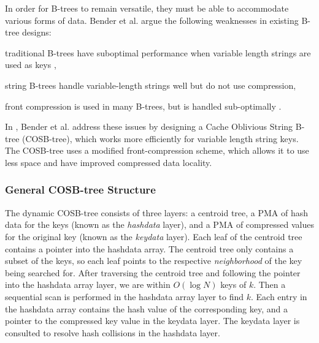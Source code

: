 \documentclass[preprint]{style}
\begin{document}
In order for B-trees to remain versatile, they must be able to accommodate
various forms of data. Bender et al. argue the following weaknesses in
existing B-tree designs: 
\begin{inparaenum}[(a)]
  \item traditional B-trees have suboptimal performance when variable length
  strings are used as keys \cite{BenderDemainColton},
  \item string B-trees \cite{Ferragina98} handle variable-length strings well
  but do not use compression, 
  \item front compression \cite{BayerUn77,ClarkSaSt69,Comer79,Wagner73} is used
  in many B-trees, but is handled sub-optimally \cite{BenderFaKu06}. 
\end{inparaenum} 

In \cite{BenderFaKu06}, Bender et al. address these issues by designing a Cache
Oblivious String B-tree (COSB-tree), which works more efficiently
for variable length string keys. The COSB-tree uses a modified front-compression
scheme, which allows it to use less space and have improved
compressed data locality.

\subsubsection{General COSB-tree Structure}

The dynamic COSB-tree consists of three layers: a centroid tree, a PMA 
of hash data for the keys (known as the 
\emph{hashdata} layer), and a PMA of compressed values for the original key
 (known as the 
\emph{keydata} layer). Each leaf of the centroid tree contains a pointer into
the hashdata array. The centroid tree only contains a subset of the keys, so
each leaf points to the respective \emph{neighborhood} of the key being
searched for. After traversing the centroid tree and following the pointer into
the hashdata array layer, we are within $O(\log{}N)$ keys of $k$. Then a
sequential scan is performed in the hashdata array layer to find $k$. Each
entry in the hashdata array contains the hash value of the corresponding key,
and a pointer to the compressed key value in the keydata layer. The keydata layer
is consulted to resolve hash collisions in the hashdata layer.

\end{document}
